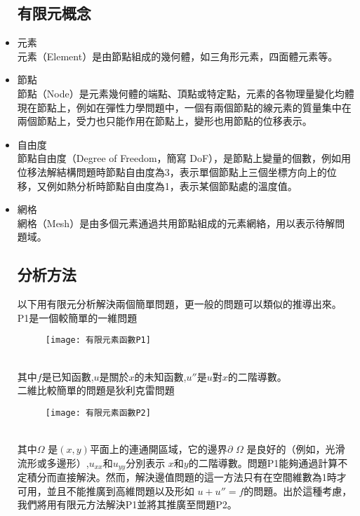 \begin{itemize}
\subsection{有限元概念}

\item 元素\\
元素（Element）是由節點組成的幾何體，如三角形元素，四面體元素等。 \\
\item 節點\\
節點（Node）是元素幾何體的端點、頂點或特定點，元素的各物理量變化均體現在節點上，例如在彈性力學問題中，一個有兩個節點的線元素的質量集中在兩個節點上，受力也只能作用在節點上，變形也用節點的位移表示。 \\
\item 自由度\\
節點自由度（Degree of Freedom，簡寫 DoF），是節點上變量的個數，例如用位移法解結構問題時節點自由度為3，表示單個節點上三個坐標方向上的位移，又例如熱分析時節點自由度為1，表示某個節點處的溫度值。 \\
\item 網格\\
網格（Mesh）是由多個元素通過共用節點組成的元素網絡，用以表示待解問題域。 \\

\subsection{分析方法}

以下用有限元分析解決兩個簡單問題，更一般的問題可以類似的推導出來。\\
P1是一個較簡單的一維問題 \\
\begin{figure}[hbt!]
\begin{center}
\texttt{[image: 有限元素函數P1]}
\end{center}
\end{figure}
\\
其中$ f$是已知函數,$ u$是關於$ x$的未知函數,$ u ″$是$ u$對$ x$的二階導數。\\
二維比較簡單的問題是狄利克雷問題 \\
\begin{figure}[hbt!]
\begin{center}
\texttt{[image: 有限元素函數P2]}
\end{center}
\end{figure}
\\
其中$\Omega$ 是$ (x,y)$平面上的連通開區域，它的邊界$ \partial $ $\Omega$ 是良好的（例如，光滑流形或多邊形）,$ u_{{xx}}$和$ u_{{yy}}$分別表示 $ x$和$ y$的二階導數。問題P1能夠通過計算不定積分而直接解決。然而，解決邊值問題的這一方法只有在空間維數為1時才可用，並且不能推廣到高維問題以及形如 $u+u''=f$的問題。出於這種考慮，我們將用有限元方法解決P1並將其推廣至問題P2。\\ 


\end{itemize}
